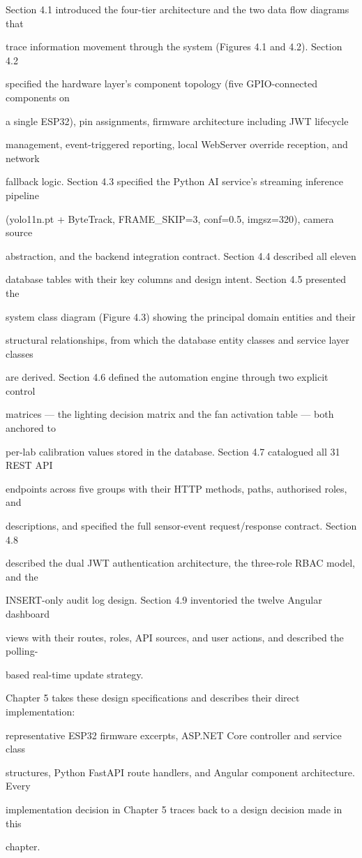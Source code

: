 Section 4.1 introduced the four-tier architecture and the two data flow diagrams that

trace information movement through the system (Figures 4.1 and 4.2). Section 4.2

specified the hardware layer's component topology (five GPIO-connected components on

a single ESP32), pin assignments, firmware architecture including JWT lifecycle

management, event-triggered reporting, local WebServer override reception, and network

fallback logic. Section 4.3 specified the Python AI service's streaming inference pipeline

(yolo11n.pt + ByteTrack, FRAME\_SKIP=3, conf=0.5, imgsz=320), camera source

abstraction, and the backend integration contract. Section 4.4 described all eleven

database tables with their key columns and design intent. Section 4.5 presented the

system class diagram (Figure 4.3) showing the principal domain entities and their

structural relationships, from which the database entity classes and service layer classes

are derived. Section 4.6 defined the automation engine through two explicit control

matrices --- the lighting decision matrix and the fan activation table --- both anchored to

per-lab calibration values stored in the database. Section 4.7 catalogued all 31 REST API

endpoints across five groups with their HTTP methods, paths, authorised roles, and

descriptions, and specified the full sensor-event request/response contract. Section 4.8

described the dual JWT authentication architecture, the three-role RBAC model, and the

INSERT-only audit log design. Section 4.9 inventoried the twelve Angular dashboard

views with their routes, roles, API sources, and user actions, and described the polling-

based real-time update strategy.

Chapter 5 takes these design specifications and describes their direct implementation:

representative ESP32 firmware excerpts, ASP.NET Core controller and service class

structures, Python FastAPI route handlers, and Angular component architecture. Every

implementation decision in Chapter 5 traces back to a design decision made in this

chapter.


